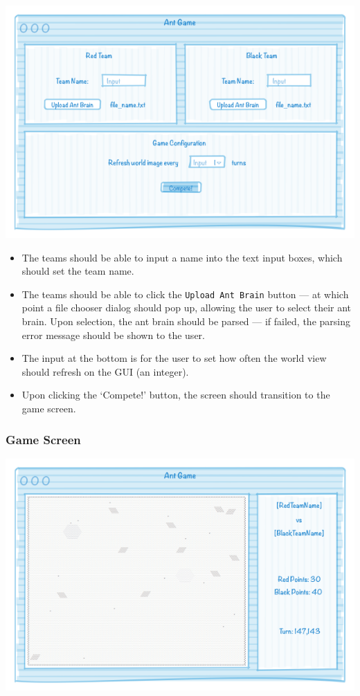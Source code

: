 \documentclass[11pt]{article}
\begin{document}
\begin{center}
\includegraphics[width=\textwidth]{low-level-diagrams/interface/game-setup-screen}
\end{center}

\begin{itemize}
\item The teams should be able to input a name into the text input boxes, which should set the team name.
\item The teams should be able to click the \texttt{Upload Ant Brain} button --- at which point a file chooser dialog should pop up, allowing the user to select their ant brain. Upon selection, the ant brain should be parsed --- if failed, the parsing error message should be shown to the user.
\item The input at the bottom is for the user to set how often the world view should refresh on the GUI (an integer).
\item Upon clicking the `Compete!' button, the screen should transition to the game screen. 
\end{itemize}

\subsubsection{Game Screen}

\begin{center}
\includegraphics[width=\textwidth]{low-level-diagrams/interface/game-screen}
\end{center}
\end{document}
